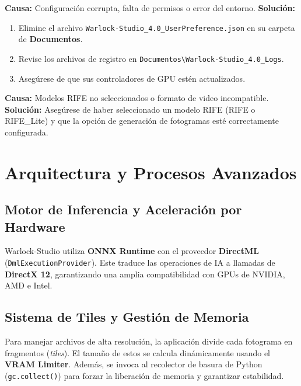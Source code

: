 \documentclass[11pt, a4paper]{article}
\newcommand{\inlinecode}[1]{\colorbox{WarlockLightGray}{\small\texttt{#1}}}
\begin{document}
\begin{description}[leftmargin=*, style=nextline, itemsep=0.8em]
    \item[\faQuestionCircle\ Problema: La aplicación no se abre]
        \textbf{Causa:} Configuración corrupta, falta de permisos o error del entorno.
        \textbf{Solución:}
        \begin{enumerate}[nosep, leftmargin=*]
            \item Elimine el archivo \inlinecode{Warlock-Studio_4.0_UserPreference.json} en su carpeta de \textbf{Documentos}.
            \item Revise los archivos de registro en \texttt{Documentos\textbackslash Warlock-Studio_4.0_Logs}.
            \item Asegúrese de que sus controladores de GPU estén actualizados.
        \end{enumerate}

    \item[\faExclamationTriangle\ Problema: La interpolación de fotogramas no funciona]
        \textbf{Causa:} Modelos RIFE no seleccionados o formato de video incompatible.
        \textbf{Solución:} Asegúrese de haber seleccionado un modelo RIFE (RIFE o RIFE\_Lite) y que la opción de generación de fotogramas esté correctamente configurada.
\end{description}

\section{Arquitectura y Procesos Avanzados}

\subsection{Motor de Inferencia y Aceleración por Hardware}
Warlock-Studio utiliza \textbf{ONNX Runtime} con el proveedor \textbf{DirectML} (\inlinecode{DmlExecutionProvider}). Este traduce las operaciones de IA a llamadas de \textbf{DirectX 12}, garantizando una amplia compatibilidad con GPUs de NVIDIA, AMD e Intel.

\subsection{Sistema de Tiles y Gestión de Memoria}
Para manejar archivos de alta resolución, la aplicación divide cada fotograma en fragmentos (\textit{tiles}). El tamaño de estos se calcula dinámicamente usando el \textbf{VRAM Limiter}. Además, se invoca al recolector de basura de Python (\inlinecode{gc.collect()}) para forzar la liberación de memoria y garantizar estabilidad.
\end{document}
